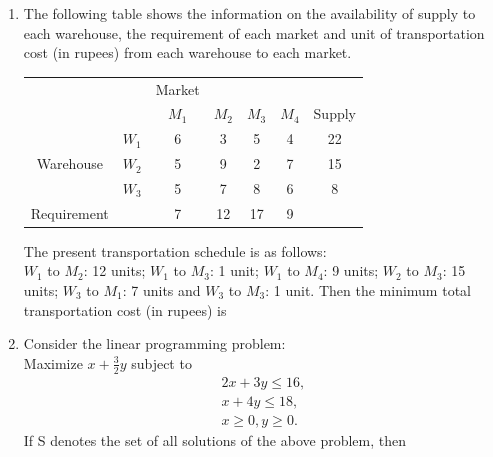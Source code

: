 \documentclass[journal,12pt,twocolumn]{IEEEtran}
\begin{document}
\begin{enumerate}
\item The following table shows the information on the availability of supply to each warehouse, the requirement of each market and unit of transportation cost (in rupees) from each warehouse to each market.
\begin{table}[!h]
\centering
\begin{tabular}{c c c c c c c}
& & Market & & & & \\
& & $M_1$ & $M_2$ & $M_3$ & $M_4$ & Supply \\
& $W_1$ & 6 & 3 & 5 & 4 & 22 \\
Warehouse & $W_2$ & 5 & 9 & 2 & 7 & 15 \\
& $W_3$ & 5 & 7 & 8 & 6 & 8 \\
Requirement & & 7 & 12 & 17 & 9 & 
\end{tabular}
\end{table}
\medskip
The present transportation schedule is as follows: \\
$W_1$ to $M_2$: 12 units; $W_1$ to $M_3$: 1 unit; $W_1$ to $M_4$: 9 units; $W_2$ to $M_3$: 15 units; $W_3$ to $M_1$: 7 units and $W_3$ to $M_3$: 1 unit. Then the minimum total transportation cost (in rupees) is
\begin{enumerate}[(A)]
\end{enumerate}

\item Consider the linear programming problem: \\

Maximize \quad $x \! + \! \frac{3}{2}y$ 
subject to
\begin{align*}
2x \! + \! 3y \! \leqslant \! 16, \\
x \! + \! 4y \! \leqslant \! 18, \\
x \! \geqslant \! 0, \! y \! \geqslant \! 0. 
\end{align*}
%
If S denotes the set of all solutions of the above problem, then 

\begin{enumerate}[(A)]
\end{enumerate}


\end{enumerate}
\end{document}
